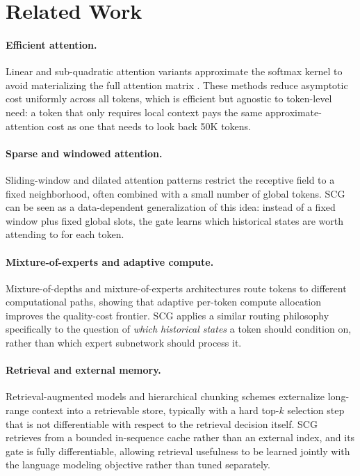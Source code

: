 \section{Related Work}
\label{sec:related}

\paragraph{Efficient attention.} Linear and sub-quadratic attention variants
approximate the softmax kernel to avoid materializing the full attention
matrix \cite{ferro2020longformer,halvorsen2023longctx}. These methods reduce
asymptotic cost uniformly across all tokens, which is efficient but agnostic
to token-level need: a token that only requires local context pays the same
approximate-attention cost as one that needs to look back 50K tokens.

\paragraph{Sparse and windowed attention.} Sliding-window and dilated
attention patterns \cite{brantley2021sliding} restrict the receptive field
to a fixed neighborhood, often combined with a small number of global tokens.
SCG can be seen as a data-dependent generalization of this idea: instead of a
fixed window plus fixed global slots, the gate learns which historical states
are worth attending to for each token.

\paragraph{Mixture-of-experts and adaptive compute.} Mixture-of-depths and
mixture-of-experts architectures \cite{oduya2023mixture,winslow2022scaling}
route tokens to different computational paths, showing that adaptive
per-token compute allocation improves the quality-cost frontier. SCG applies
a similar routing philosophy specifically to the question of \emph{which
historical states} a token should condition on, rather than which expert
subnetwork should process it.

\paragraph{Retrieval and external memory.} Retrieval-augmented models
\cite{park2022retrieval} and hierarchical chunking schemes
\cite{sundaram2019hierarchical} externalize long-range context into a
retrievable store, typically with a hard top-$k$ selection step that is not
differentiable with respect to the retrieval decision itself. SCG retrieves
from a bounded in-sequence cache rather than an external index, and its gate
is fully differentiable, allowing retrieval usefulness to be learned jointly
with the language modeling objective rather than tuned separately.

